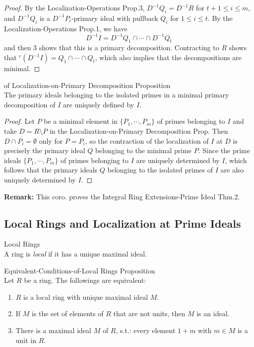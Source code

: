 \begin{proof}
    By the Localization-Operations Prop.3, $D^{-1}Q_i= D^{-1}R$ for $t+1 \leq i\leq m$, and $D^{-1}Q_i$ is a $D^{-1}P_i$-primary ideal with pullback $Q_i$ for $1 \leq i\leq t$. By the Localization-Operations Prop.1, we have
    $$D^{-1}I= D^{-1}Q_1 \cap \cdots \cap D^{-1}Q_t$$
    and then 3 shows that this is a primary decomposition. Contracting to $R$ shows that $^c(D^{-1}I)= Q_1 \cap \cdots \cap Q_t$, which also implies that the decompositions are minimal.
\end{proof}

\begin{corollary}{of Localization-on-Primary Decomposition Proposition}\\
The primary ideals belonging to the isolated primes in a minimal primary decomposition of $I$ are uniquely defined by $I$.
\end{corollary}

\begin{proof}
    Let $P$ be a minimal element in $\{P_1 ,\cdots, P_m\}$ of primes belonging to $I$ and take $D=R\setminus P$ in the Localization-on-Primary Decomposition Prop. Then $D\cap P_i=\emptyset$ only for $P=P_i$, so the contraction of the localization of $I$ at $D$ is precisely the primary ideal $Q$ belonging to the minimal prime $P$. Since the prime ideals $\{P_1 ,\cdots, P_m\}$ of primes belonging to $I$ are uniquely determined by $I$, which follows that the primary ideals $Q$ belonging to the isolated primes of $I$ are also uniquely determined by $I$.
\end{proof}

\noindent\textbf{Remark:} This coro. proves the Integral Ring Extensions-Prime Ideal Thm.2.

\subsection{Local Rings and Localization at Prime Ideals}

\begin{definition}{Local Rings}\\
A ring is \textit{local} if it has a unique maximal ideal.
\end{definition}

\begin{proposition}{Equivalent-Conditions-of-Local Rings Proposition}\\
Let $R$ be a ring. The followings are equivalent:
\begin{enumerate}
    \item $R$ is a local ring with unique maximal ideal $M$.

    \item If $M$ is the set of elements of $R$ that are not units, then $M$ is an ideal.
    \item There is a maximal ideal $M$ of $R$, s.t.: every element $1+m$ with $m \in M$ is a unit in $R$.
\end{enumerate}
\end{proposition}

